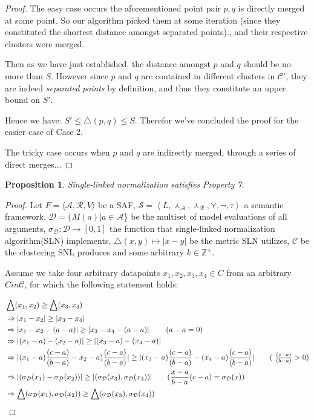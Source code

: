 \documentclass{article}
\newtheorem{proposition}{Proposition}
\newcommand{\args}{\mathcal{A}} %
\newcommand{\att}{\mathcal{R}}  %
\newcommand{\valueset}{L}
\newcommand{\safid}{F}               %
\newcommand{\saf}{\safid = \safbody} %
\newcommand{\safbody}{\langle \args, \att, V \rangle} %
\newcommand{\sembodyNew}{\left\langle \valueset,\SAFand_\mathcal{A}, \SAFand_\mathcal{R},\SAFor,\lnot,\tau \right\rangle} %
\newcommand{\SAFand}{\curlywedge}     %
\newcommand{\SAFor}{\curlyvee}        %
\newcommand{\sem}{\mathcal{S}}
\newcommand{\dataset}{\mathcal{D}}   %
\newcommand{\clusterset}{\mathcal{C}}   %
\begin{document}
\begin{proof}
The easy case occurs the aforementioned point pair $p ,q$ is directly merged at some point. So our algorithm picked them at some iteration (since they constituted the shortest distance amongst separated points)., and their respective clusters were merged.

Then as we have just established, the distance amongst $p$ and $q$ should be no more than $S$. However since $p$ and $q$ are contained in different clusters in $\clusterset'$, they are indeed \textit{separated points} by definition, and thus they constitute an upper bound on $S'$.

Hence we have: $S' \leq \bigtriangleup(p, q) \leq S$. Therefor we've concluded the proof for the easier case of Case 2.
 
The tricky case occurs when $p$ and $q$ are indirectly merged, through a series of direct merges... 
\end{proof}

\begin{proposition}
Single-linked normalization satisfies Property 7.
\end{proposition}

\begin{proof}
Let $\saf$ be a SAF, $\sem = \sembodyNew$ a semantic framework, $\dataset = \{M(a)|a \in \args$\} be the multiset of model evaluations of all arguments, $\sigma_{\dataset}: \dataset  \rightarrow  [0,1]$ the function that single-linked normalization algorithm(SLN) implements, $\bigtriangleup(x,y) \mapsto |x - y|$ be the metric SLN utilizes, $\clusterset$ be the clustering SNL produces and some arbitrary $k \in \mathbb{Z}^{+}$.

Assume we take four arbitrary datapoints  $x_1, x_2, x_3, x_4 \in C$ from an arbitrary $C in \clusterset$, for which the following statement holds:


\begin{align*}
 & \bigtriangleup(x_1, x_2) \geq \bigtriangleup(x_3, x_4)
 \\ &\Rightarrow |x_1 - x_2| \geq |x_3 - x_4|
 \\ &\Rightarrow |x_1 - x_2 - (a - a)| \geq |x_3 - x_4 - (a - a)| \>                 \tag{$a - a = 0$}
 \\ &\Rightarrow |(x_1 - a) - (x_2  - a)| \geq |(x_3  - a) - (x_4 - a)| 
\\ &\Rightarrow |(x_1 - a) \frac{(c-a)}{(b-a)} - x_2  - a) \frac{(c-a)}{(b-a)}| \geq |(x_3  - a) \frac{(c-a)}{(b-a)} - (x_4 - a) \frac{(c-a)}{(b-a)}|  \tag{ $\frac{(c-a)}{(b-a)} > 0$}
 \\&\Rightarrow  |(\sigma_{\dataset}(x_1) - \sigma_{\dataset}(x_2))| \geq |(\sigma_{\dataset}(x_3), \sigma_{\dataset}(x_4))|					\tag{$\dfrac{x-a}{b-a} (c-a)=\sigma_{\dataset}(x)$}
 \\&\Rightarrow  \bigtriangleup(\sigma_{\dataset}(x_1), \sigma_{\dataset}(x_2)) \geq \bigtriangleup(\sigma_{\dataset}(x_3), \sigma_{\dataset}(x_4))
\end{align*}
\end{proof}
\end{document}
